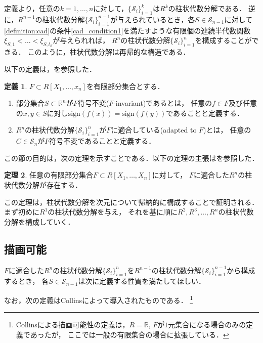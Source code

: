 \documentclass[uplatex, dvipdfmx]{jsarticle}
\numberwithin{equation}{section}
\newcommand{\R}{\mathbb{R}}
\newcommand{\calS}{\mathcal{S}}
\newcommand{\sign}{\mathrm{sign}}
\theoremstyle{definition}
\newtheorem{definition}{定義}[section]
\newtheorem{theorem}[definition]{定理}
\begin{document}
定義より，任意の$k=1, \dots, n$に対して，$\{\calS_i\}_{i=1}^k$は$R^k$の柱状代数分解である．
逆に，$R^{n-1}$の柱状代数分解$\{\calS_i\}_{i=1}^{n-1}$が与えられているとき，各$S \in \calS_{n-1}$に対して
\cref{definition:cad}の条件\ref{cad_condition1}を満たすような有限個の連続半代数関数$\xi_{S,1}<\dots<\xi_{S,l_S}$が与えられれば，
$R^n$の柱状代数分解$\{\calS_i\}_{i=1}^n$を構成することができる．
このように，柱状代数分解は再帰的な構造である．

以下の定義は，\cite[Definition 5.5]{MR2248869}を参照した．
\begin{definition}
     $F \subset R[X_1, \dots, x_n]$を有限部分集合とする．
     \begin{enumerate}
          \item 部分集合$S \subset \R^n$が$F$符号不変($F$-invariant)であるとは，
          任意の$f \in F$及び任意の$x,y \in S$に対し$\sign(f(x))=\sign(f(y))$であることと定義する．

          \item $R^n$の柱状代数分解$\{\calS_i\}_{i=1}^n$が$F$に適合している(adapted to $F$)とは，
          任意の$C \in \calS_n$が$F$符号不変であることと定義する．
     \end{enumerate}
\end{definition}

この節の目的は，次の定理を示すことである．以下の定理の主張は\cite[Theorem 5.6]{MR2248869}を参照した．
\begin{theorem} \label{theorem:cad}
     任意の有限部分集合$F \subset R[X_1, \dots, X_n]$に対して，
     $F$に適合した$R^n$の柱状代数分解が存在する．
\end{theorem}

この定理は，柱状代数分解を次元について帰納的に構成することで証明される．
まず初めに$R^1$の柱状代数分解を与え，
それを基に順に$R^2, R^3, \dots, R^n$の柱状代数分解を構成していく．

\subsection{描画可能}
$F$に適合した$R^n$の柱状代数分解$\{\calS_i\}_{i=1}^n$を$R^{n-1}$の柱状代数分解$\{\calS_i\}_{i=1}^{n-1}$から構成するとき，
各$S \in \calS_{n-1}$は次に定義する性質を満たしてほしい．

なお，次の定義はCollins\cite{MR0403962}によって導入されたものである．
\footnote{
     Collins\cite{MR0403962}による描画可能性の定義は，$R=\R$, $F$が$1$元集合になる場合のみの定義であったが，
     ここでは一般の有限集合の場合に拡張している．
}
\end{document}

